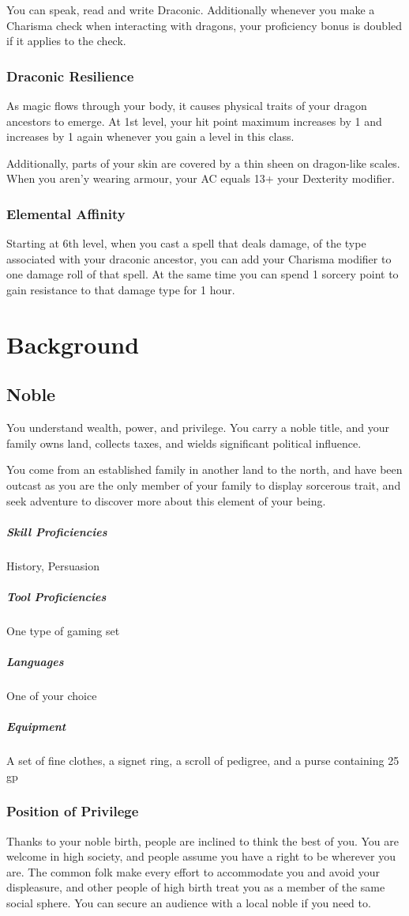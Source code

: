 \documentclass[letterpaper,openany,oneside,twocolumn]{book}
\begin{document}
You can speak, read and write Draconic. Additionally whenever you make a Charisma check when interacting with dragons, your proficiency bonus is doubled if it applies to the check.

\subsubsection*{Draconic Resilience}
As magic flows through your body, it causes physical traits of your dragon ancestors to emerge. At 1st level, your hit point maximum increases by 1 and increases by 1 again whenever you gain a level in this class.

Additionally, parts of your skin are covered by a thin sheen on dragon-like scales. When you aren'y wearing armour, your AC equals 13+ your Dexterity modifier.


\subsubsection*{Elemental Affinity}
Starting at 6th level, when you cast a spell that deals damage, of the type associated with your draconic ancestor, you can add your Charisma modifier to one damage roll of that spell. At the same time you can spend 1 sorcery point to gain resistance to that damage type for 1 hour.

\section*{Background}
\subsection*{Noble}
You understand wealth, power, and privilege. You carry a noble title, and your family owns land, collects taxes, and wields significant political influence.

You come from an established family in another land to the north, and have been outcast as you are the only member of your family to display sorcerous trait, and seek adventure to discover more about this element of your being.

\subparagraph*{Skill Proficiencies} History, Persuasion
\subparagraph*{Tool Proficiencies} One type of gaming set
\subparagraph*{Languages} One of your choice
\subparagraph*{Equipment} A set of fine clothes, a signet ring, a scroll of pedigree, and a purse containing 25 gp

\subsubsection*{Position of Privilege}
Thanks to your noble birth, people are inclined to think the best of you. You are welcome in high society, and people assume you have a right to be wherever you are. The common folk make every effort to accommodate you and avoid your displeasure, and other people of high birth treat you as a member of the same social sphere. You can secure an audience with a local noble if you need to.
\end{document}
